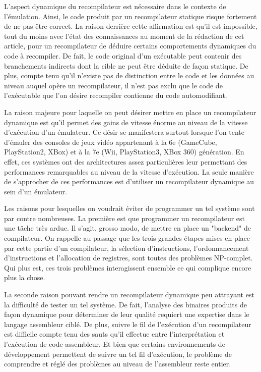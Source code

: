 \documentclass{article} %
\begin{document}
L'aspect dynamique du recompilateur est nécessaire dans le contexte de l'émulation. Ainsi, le code produit par un recompilateur statique risque fortement de ne pas être correct. La raison derrière cette affirmation est qu'il est impossible, tout du moins avec l'état des connaissances au moment de la rédaction de cet article, pour un recompilateur de déduire certains comportements dynamiques du code à recompiler. De fait, le code original d'un exécutable peut contenir des branchements indirects dont la cible ne peut être déduite de façon statique. De plus, compte tenu qu'il n'existe pas de distinction entre le code et les données au niveau auquel opère un recompilateur, il n'est pas exclu que le code de l'exécutable que l'on désire recompiler contienne du code automodifiant.

La raison majeure pour laquelle on peut désirer mettre en place un recompilateur dynamique est qu'il permet des gains de vitesse énorme au niveau de la vitesse d'exécution d'un émulateur. Ce désir se manifestera surtout lorsque l'on tente d'émuler des consoles de jeux vidéo appartenant à la 6e (GameCube, PlayStation2, XBox) et à la 7e (Wii, PlayStation3, XBox 360) génération. En effet, ces systèmes ont des architectures assez particulières leur permettant des performances remarquables au niveau de la vitesse d'exécution. La seule manière de s'approcher de ces performances est d'utiliser un recompilateur dynamique au sein d'un émulateur.

Les raisons pour lesquelles on voudrait éviter de programmer un tel système sont par contre nombreuses. La première est que programmer un recompilateur est une tâche très ardue. Il s'agit, grosso modo, de mettre en place un "backend" de compilateur. On rappelle au passage que les trois grandes étapes mises en place par cette partie d'un compilateur, la sélection d'instructions, l'ordonnancement d'instructions et l'allocation de registres, sont toutes des problèmes NP-complet. Qui plus est, ces trois problèmes interagissent ensemble ce qui complique encore plus la chose. 

La seconde raison pouvant rendre un recompilateur dynamique peu attrayant est la difficulté de tester un tel système. De fait, l'analyse des binaires produits de façon dynamique pour déterminer de leur qualité requiert une expertise dans le langage assembleur ciblé. De plus, suivre le fil de l'exécution d'un recompilateur est difficile compte tenu des sauts qu'il effectue entre l'interprétation et l'exécution de code assembleur. Et bien que certains environnements de développement permettent de suivre un tel fil d'exécution, le problème de comprendre et réglé des problèmes au niveau de l'assembleur reste entier.
\end{document}

